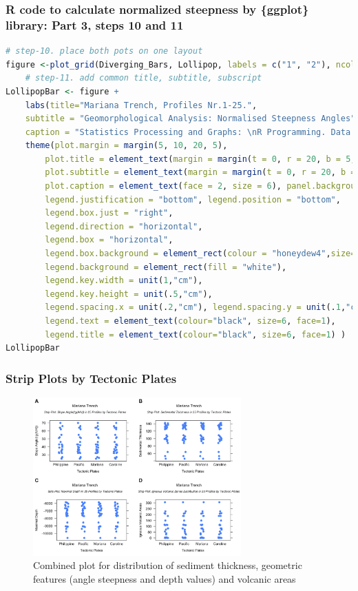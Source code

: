 \documentclass[pdflatex,compress,10pt,
	xcolor={dvipsnames,dvipsnames,svgnames,x11names,table},
	hyperref={colorlinks = true,breaklinks = true, urlcolor = NavyBlue, breaklinks = true}]{beamer}
\begin{document}
\begin{frame}[fragile]\frametitle{R code to calculate normalized steepness by \{ggplot\} library: Part 3, steps 10 and 11}
\begin{lstlisting}[language=R]
	# step-10. place both pots on one layout
figure <-plot_grid(Diverging_Bars, Lollipop, labels = c("1", "2"), ncol = 2, nrow = 1)
	# step-11. add common title, subtitle, subscript
LollipopBar <- figure +						
	labs(title="Mariana Trench, Profiles Nr.1-25.", 
	subtitle = "Geomorphological Analysis: Normalised Steepness Angles",
	caption = "Statistics Processing and Graphs: \nR Programming. Data Source: QGIS") +
	theme(plot.margin = margin(5, 10, 20, 5),
		plot.title = element_text(margin = margin(t = 0, r = 20, b = 5, l = 0), family = "Kai", face = "bold", size = 12), 
		plot.subtitle = element_text(margin = margin(t = 0, r = 20, b = 4, l = 0), family = "Hei", face = "bold", size = 10), 
		plot.caption = element_text(face = 2, size = 6), panel.background=ggplot2::element_rect(fill = "white"),
		legend.justification = "bottom", legend.position = "bottom",
		legend.box.just = "right", 
		legend.direction = "horizontal", 
		legend.box = "horizontal",
		legend.box.background = element_rect(colour = "honeydew4",size=0.2),
		legend.background = element_rect(fill = "white"),
		legend.key.width = unit(1,"cm"), 
		legend.key.height = unit(.5,"cm"),
		legend.spacing.x = unit(.2,"cm"), legend.spacing.y = unit(.1,"cm"),
		legend.text = element_text(colour="black", size=6, face=1),
		legend.title = element_text(colour="black", size=6, face=1) )
LollipopBar
\end{lstlisting}
\end{frame}

\begin{frame}\frametitle{Strip Plots by Tectonic Plates}
\begin{figure}[H]
	\centering
		\includegraphics[width=8cm]{Fig-3-2.jpg}\caption{Combined plot for distribution of sediment thickness, geometric features (angle steepness and depth values) and volcanic areas}
\end{figure}		
\end{frame}
\end{document}
